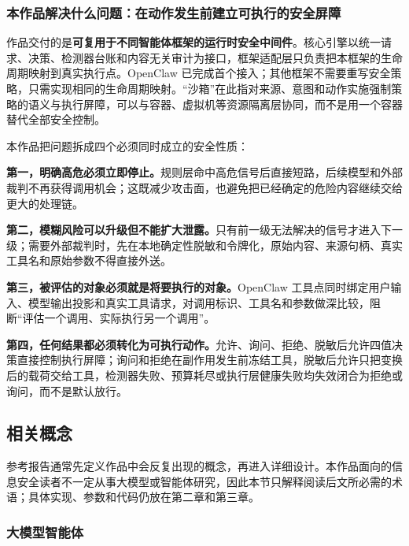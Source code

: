 \subsubsection{本作品解决什么问题：在动作发生前建立可执行的安全屏障}

\begin{center}
\setlength{\fboxsep}{8pt}
\end{center}

作品交付的是\textbf{可复用于不同智能体框架的运行时安全中间件}。核心引擎以统一请求、决策、检测器台账和内容无关审计为接口，框架适配层只负责把本框架的生命周期映射到真实执行点。OpenClaw 已完成首个接入；其他框架不需要重写安全策略，只需实现相同的生命周期映射。“沙箱”在此指对来源、意图和动作实施强制策略的语义与执行屏障，可以与容器、虚拟机等资源隔离层协同，而不是用一个容器替代全部安全控制。

本作品把问题拆成四个必须同时成立的安全性质：

\textbf{第一，明确高危必须立即停止。}规则层命中高危信号后直接短路，后续模型和外部裁判不再获得调用机会；这既减少攻击面，也避免把已经确定的危险内容继续交给更大的处理链。

\textbf{第二，模糊风险可以升级但不能扩大泄露。}只有前一级无法解决的信号才进入下一级；需要外部裁判时，先在本地确定性脱敏和令牌化，原始内容、来源句柄、真实工具名和原始参数不得直接外送。

\textbf{第三，被评估的对象必须就是将要执行的对象。}OpenClaw 工具点同时绑定用户输入、模型输出投影和真实工具请求，对调用标识、工具名和参数做深比较，阻断“评估一个调用、实际执行另一个调用”。

\textbf{第四，任何结果都必须转化为可执行动作。}允许、询问、拒绝、脱敏后允许四值决策直接控制执行屏障；询问和拒绝在副作用发生前冻结工具，脱敏后允许只把变换后的载荷交给工具，检测器失败、预算耗尽或执行层健康失败均失效闭合为拒绝或询问，而不是默认放行。

\subsection{相关概念}

参考报告通常先定义作品中会反复出现的概念，再进入详细设计。本作品面向的信息安全读者不一定从事大模型或智能体研究，因此本节只解释阅读后文所必需的术语；具体实现、参数和代码仍放在第二章和第三章。

\subsubsection{大模型智能体}

